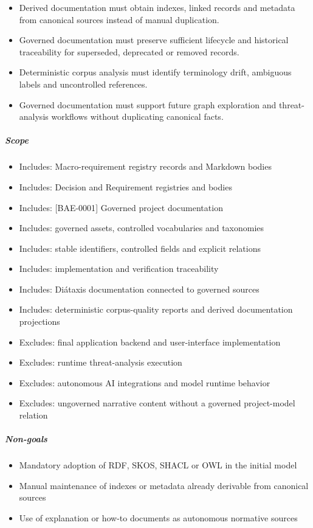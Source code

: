 \documentclass[
  10pt,
]{article}
\providecommand{\tightlist}{%
  \setlength{\itemsep}{0pt}\setlength{\parskip}{0pt}}
\begin{document}
\begin{itemize}
  Explanation and how-to documents must not become independent canonical
  sources of governed obligations.
\item
  Derived documentation must obtain indexes, linked records and metadata
  from canonical sources instead of manual duplication.
\item
  Governed documentation must preserve sufficient lifecycle and
  historical traceability for superseded, deprecated or removed records.
\item
  Deterministic corpus analysis must identify terminology drift,
  ambiguous labels and uncontrolled references.
\item
  Governed documentation must support future graph exploration and
  threat-analysis workflows without duplicating canonical facts.
\end{itemize}

\subparagraph{Scope}\label{scope}

\begin{itemize}
\tightlist
\item
  Includes: Macro-requirement registry records and Markdown bodies
\item
  Includes: Decision and Requirement registries and bodies
\item
  Includes: {[}BAE-0001{]} Governed project documentation
\item
  Includes: governed assets, controlled vocabularies and taxonomies
\item
  Includes: stable identifiers, controlled fields and explicit relations
\item
  Includes: implementation and verification traceability
\item
  Includes: Diátaxis documentation connected to governed sources
\item
  Includes: deterministic corpus-quality reports and derived
  documentation projections
\item
  Excludes: final application backend and user-interface implementation
\item
  Excludes: runtime threat-analysis execution
\item
  Excludes: autonomous AI integrations and model runtime behavior
\item
  Excludes: ungoverned narrative content without a governed
  project-model relation
\end{itemize}

\subparagraph{Non-goals}\label{non-goals}

\begin{itemize}
\tightlist
\item
  Mandatory adoption of RDF, SKOS, SHACL or OWL in the initial model
\item
  Manual maintenance of indexes or metadata already derivable from
  canonical sources
\item
  Use of explanation or how-to documents as autonomous normative sources
\end{itemize}
\end{document}
